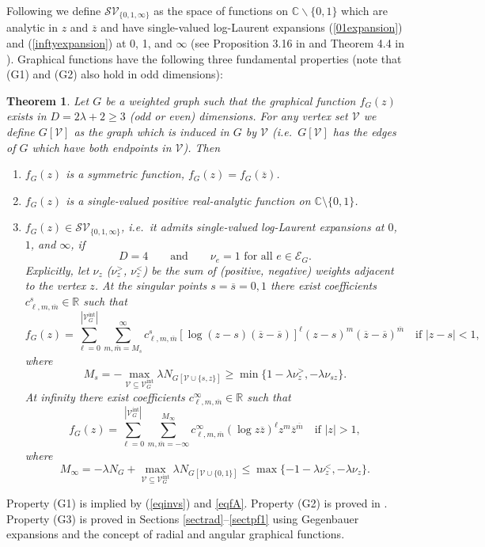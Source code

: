 \documentclass[oneside]{amsart}
\newcommand{\CC}{{\mathbb C}}
\newcommand{\RR}{{\mathbb R}}
\newcommand{\mm}{{\overline{m}}}
\newcommand{\sss}{{\overline{s}}}
\newcommand{\zz}{{\overline{z}}}
\newcommand{\sE}{\mathcal{E}}
\newcommand{\sS}{\mathcal{S}}
\newcommand{\sV}{\mathcal{V}}
\newcommand{\sVGint}{{\sV_G^\mathrm{int}}}
\newcommand{\VGint}{{|\sVGint|}}
\theoremstyle{plain}
\newtheorem{thm}{Theorem}
\begin{document}
Following \cite{GSVH} we define $\sS\sV_{\{0,1,\infty\}}$ as the space of functions on $\CC\backslash{\{0,1\}}$ which are analytic in $z$ and $\zz$ and
have single-valued log-Laurent expansions (\ref{01expansion}) and (\ref{inftyexpansion}) at 0, 1, and $\infty$ (see Proposition 3.16 in \cite{gf} and Theorem 4.4 in \cite{numfunct}).
Graphical functions have the following three fundamental properties (note that (G1) and (G2) also hold in odd dimensions):

\begin{thm}\label{thm1}
Let $G$ be a weighted graph such that the graphical function $f_G(z)$ exists in $D=2\lambda+2\geq3$ (odd or even) dimensions.
For any vertex set $\sV$ we define $G[\sV]$ as the graph which is induced in $G$ by $\sV$ (i.e.\ $G[\sV]$ has the edges of $G$ which have both endpoints in $\sV$).
Then
\begin{enumerate}
\item[(G1)] $f_G(z)$ is a symmetric function, $f_G(z)=f_G(\zz)$.
\item[(G2)] $f_G(z)$ is a single-valued positive real-analytic function on $\CC\setminus\{0,1\}$.
\item[(G3)] $f_G(z)\in\sS\sV_{\{0,1,\infty\}}$, i.e.\ it admits single-valued log-Laurent expansions at $0$, $1$, and $\infty$, if
\begin{equation}\label{thm1cond}
D=4\qquad\text{and}\qquad\nu_e=1\text{ for all }e\in\sE_G.
\end{equation}
Explicitly, let $\nu_z$ ($\nu_z^>$, $\nu_z^<$) be the sum of (positive, negative) weights adjacent to the vertex $z$.
At the singular points $s=\sss=0,1$ there exist coefficients $c_{\ell,m,\mm}^s\in\RR$ such that
\begin{equation}\label{01expansion}
f_G(z)=\sum_{\ell=0}^\VGint\sum_{m,\mm=M_s}^\infty c_{\ell,m,\mm}^s[\log(z-s)(\zz-\sss)]^\ell(z-s)^m(\zz-\sss)^\mm\quad\text{if }|z-s|<1,
\end{equation}
where
\begin{equation}\label{Ma}
M_s=-\max_{\sV\subseteq\sVGint}\lambda N_{G[\sV\cup\{s,z\}]}\geq\min\{1-\lambda\nu_z^>,-\lambda\nu_{sz}\}.
\end{equation}
At infinity there exist coefficients $c_{\ell,m,\mm}^\infty\in\RR$ such that
\begin{equation}\label{inftyexpansion}
f_G(z)=\sum_{\ell=0}^\VGint\sum_{m,\mm=-\infty}^{M_\infty}c_{\ell,m,\mm}^\infty(\log z\zz)^\ell z^m\zz^\mm\quad\text{if }|z|>1,
\end{equation}
where
\begin{equation}\label{Minfty}
M_\infty=-\lambda N_G+\max_{\sV\subseteq\sVGint}\lambda N_{G[\sV\cup\{0,1\}]}\leq\max\{-1-\lambda\nu_z^<,-\lambda\nu_z\}.
\end{equation}
\end{enumerate}
\end{thm}
Property (G1) is implied by (\ref{eqinvs}) and \eqref{eqfA}. Property (G2) is proved in \cite{par}.
Property (G3) is proved in Sections \ref{sectrad}--\ref{sectpf1} using Gegenbauer expansions and the concept of radial and angular graphical functions.
\end{document}
